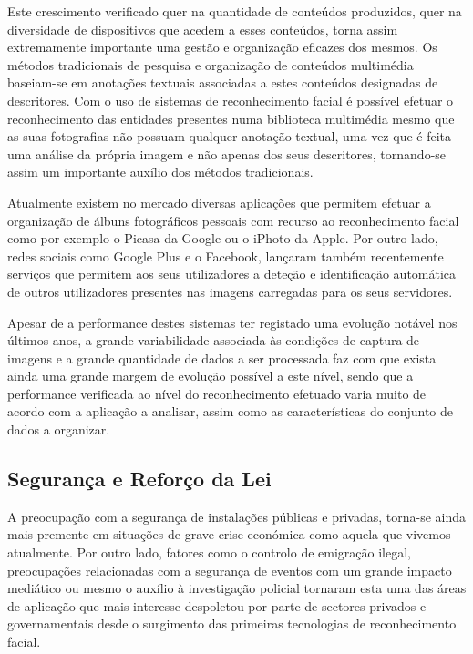 Este crescimento verificado quer na quantidade de conteúdos produzidos, quer na diversidade de dispositivos que acedem a esses conteúdos, torna assim extremamente importante uma gestão e organização eficazes dos mesmos. Os métodos tradicionais de pesquisa e organização de conteúdos multimédia baseiam-se em anotações textuais associadas a estes conteúdos designadas de descritores. Com o uso de sistemas de reconhecimento facial é possível efetuar o reconhecimento das entidades presentes numa biblioteca multimédia mesmo que as suas fotografias não possuam qualquer anotação textual, uma vez que é feita uma análise da própria imagem e não apenas dos seus descritores, tornando-se assim um importante auxílio dos métodos tradicionais.

Atualmente existem no mercado diversas aplicações que permitem efetuar a organização de álbuns fotográficos  pessoais com recurso ao reconhecimento facial como por exemplo o Picasa da Google ou o iPhoto da Apple. Por outro lado, redes sociais como Google Plus e o Facebook, lançaram também recentemente serviços que permitem aos seus utilizadores a deteção e identificação automática de outros utilizadores presentes nas imagens carregadas para os seus servidores.

Apesar de a performance destes sistemas ter registado uma evolução notável nos últimos anos, a grande variabilidade associada às condições de captura de imagens e a grande quantidade de dados a ser processada faz com que exista ainda uma grande margem de evolução possível a este nível, sendo que a performance verificada ao nível do reconhecimento efetuado varia muito de acordo com a aplicação a analisar, assim como as características do conjunto de dados a organizar.

\subsection{Segurança e Reforço da Lei} \label{Vigilancia}
A preocupação com a segurança de instalações públicas e privadas, torna-se ainda mais premente em situações de grave crise económica como aquela que vivemos atualmente. Por outro lado, fatores como o controlo de emigração ilegal, preocupações relacionadas com a segurança de eventos com um grande impacto mediático ou mesmo o auxílio à investigação policial tornaram esta uma das áreas de aplicação que mais interesse despoletou por parte de sectores privados e governamentais desde o surgimento das primeiras tecnologias de reconhecimento facial.

